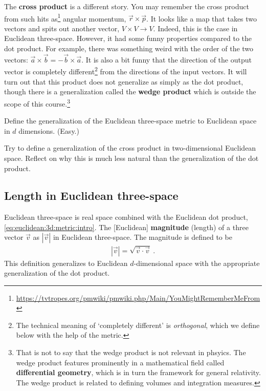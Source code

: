 \documentclass[12pt]{article}
\begin{document}
The \textbf{cross product} is a different story. You may remember the cross product from such hits as\footnote{\url{https://tvtropes.org/pmwiki/pmwiki.php/Main/YouMightRememberMeFrom}} angular momentum, $\vec{r}\times\vec{p}$. It looks like a map that takes two vectors and spits out another vector, $V\times V \to V$. Indeed, this is the case in Euclidean three-space. However, it had some funny properties compared to the dot product. For example, there was something weird with the order of the two vectors: $\vec{a}\times \vec{b}  = - \vec{b}\times \vec{a}$. It is also a bit funny that the direction of the output vector is completely different\footnote{The technical meaning of `completely different' is \emph{orthogonal}, which we define below with the help of the metric.} from the directions of the input vectors. It will turn out that this product does not generalize as simply as the dot product, though there is a generalization called the \textbf{wedge product} which is outside the scope of this course.\footnote{That is not to say that the wedge product is not relevant in phsyics. The wedge product features prominently in a mathematical field called \textbf{differential geometry}, which is in turn the framework for general relativity. The wedge product is related to defining volumes and integration measures.}

\begin{exercise}
Define the generalization of the Euclidean three-space metric to Euclidean space in $d$ dimensions. (Easy.)
\end{exercise}

\begin{exercise}
Try to define a generalization of the cross product in two-dimensional Euclidean space. Reflect on why this is much less natural than the generalization of the dot product. 
\end{exercise}

\subsection{Length in Euclidean three-space}

Euclidean three-space is real space combined with the Euclidean dot product, \eqref{eq:euclidean:3d:metric:intro}. The [Euclidean] \textbf{magnitude} (length) of a three vector $\vec{v}$ as $|\vec{v}|$ in Euclidean three-space. The magnitude is defined to be
\begin{align}
    |\vec{v}| = \sqrt{\vec{v}\cdot\vec{v}} \ .
\end{align}
This definition generalizes to Euclidean $d$-dimensional space with the appropriate generalization of the dot product.
\end{document}
